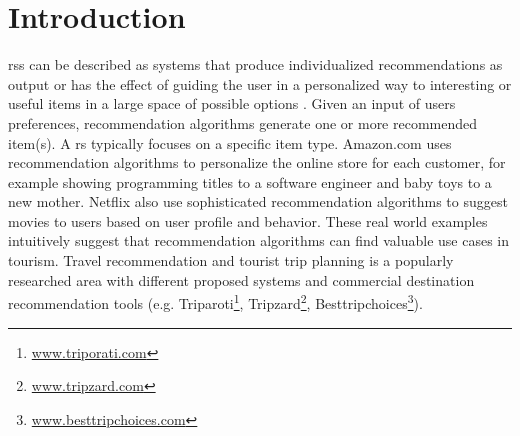 

\chapter{Introduction}\label{chapter:introduction}
\Glspl{rs} can be described as systems that produce individualized recommendations
as output or has the effect of guiding the user in a personalized way to interesting
or useful items in a large space of possible options \parencite{Burke2002HybridInteraction}. Given an input of users preferences, recommendation algorithms generate one or more recommended item(s). A \gls{rs} typically focuses on a specific item type. Amazon.com \parencite{Linden2003Amazon.comFiltering} uses recommendation algorithms to personalize the online store for each customer, for example showing programming titles to a software engineer and baby toys to a new mother.  Netflix \parencite{Amatriain2013BigRecommendations} also use sophisticated recommendation algorithms to suggest movies to users based on user profile and behavior. These real world examples intuitively suggest that recommendation algorithms can find valuable use cases in tourism. Travel recommendation and tourist trip planning is a popularly researched area with different proposed systems \parencite{wolfgang_umap_recsystem, cbrecsys2014, Thiengburanathum2018AnTourists, Arif2020Blockchain-BasedSystem, Alrasheed2020ASystem} and commercial destination recommendation tools (e.g. Triparoti\footnote{\url{www.triporati.com}}, Tripzard\footnote{\url{www.tripzard.com}}, Besttripchoices\footnote{\url{www.besttripchoices.com}}).


